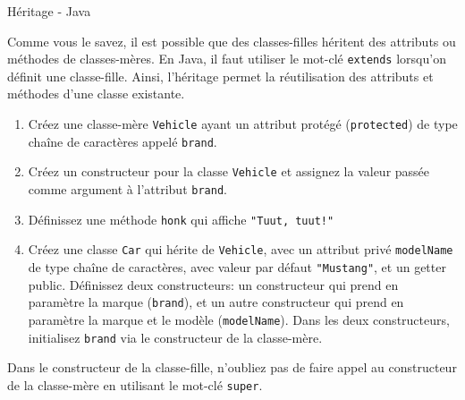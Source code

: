 	
\begin{Exercice}[10 minutes]{Héritage - Java}

	Comme vous le savez, il est possible que des classes-filles héritent des attributs ou méthodes de classes-mères.
	En Java, il faut utiliser le mot-clé \lstinline{extends} lorsqu'on définit une classe-fille. Ainsi, l'héritage permet la réutilisation des attributs et méthodes d'une classe existante.

	\begin{enumerate}
		\item Créez une classe-mère \lstinline{Vehicle} ayant un attribut protégé (\lstinline{protected}) de type chaîne de caractères appelé \lstinline{brand}.
		\item Créez un constructeur pour la classe \lstinline{Vehicle} et assignez la valeur passée comme argument à l'attribut \lstinline{brand}.
		\item Définissez une méthode \lstinline{honk} qui affiche \lstinline{"Tuut, tuut!"}
		\item Créez une classe \lstinline{Car} qui hérite de \lstinline{Vehicle}, avec un attribut privé \lstinline{modelName} de type chaîne de caractères, avec valeur par défaut \lstinline{"Mustang"}, et un getter public. Définissez deux constructeurs: un constructeur qui prend en paramètre la marque (\lstinline|brand|), et un autre constructeur qui prend en paramètre la marque et le modèle (\lstinline|modelName|). Dans les deux constructeurs, initialisez \lstinline|brand| via le constructeur de la classe-mère.
	\end{enumerate}

	\begin{conseil}
		Dans le constructeur de la classe-fille, n'oubliez pas de faire appel au constructeur de la classe-mère en utilisant le mot-clé \lstinline{super}.
	\end{conseil}	
	
	\begin{solution}
		 
	\end{solution}
	\begin{solution}
		 
	\end{solution}
\end{Exercice}

